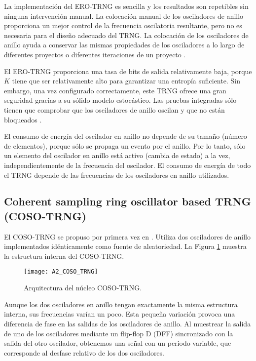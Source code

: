             La implementación del ERO-TRNG es sencilla y los resultados son repetibles sin ninguna intervención manual. La colocación manual de los osciladores de anillo proporciona un mejor control de la frecuencia oscilatoria resultante, pero no es necesaria para el diseño adecuado del TRNG. La colocación de los osciladores de anillo ayuda a conservar las mismas propiedades de los osciladores a lo largo de diferentes proyectos o diferentes iteraciones de un proyecto \cite{Choi2021}.

            El ERO-TRNG proporciona una tasa de bits de salida relativamente baja, porque $K$ tiene que ser relativamente alto para garantizar una entropía suficiente. Sin embargo, una vez configurado correctamente, este TRNG ofrece una gran seguridad gracias a su sólido modelo estocástico. Las pruebas integradas sólo tienen que comprobar que los osciladores de anillo oscilan y que no están bloqueados \cite{Bochard2010,Wold2008}.

            El consumo de energía del oscilador en anillo no depende de su tamaño (número de elementos), porque sólo se propaga un evento por el anillo. Por lo tanto, sólo un elemento del oscilador en anillo está activo (cambia de estado) a la vez, independientemente de la frecuencia del oscilador. El consumo de energía de todo el TRNG depende de las frecuencias de los osciladores en anillo utilizados.

		\subsection{Coherent sampling ring oscillator based TRNG (COSO-TRNG)}

                El COSO-TRNG se propuso por primera vez en \cite{Kohlbrenner2004}. Utiliza dos osciladores de anillo implementados idénticamente como fuente de aleatoriedad. La Figura \ref{fig:A2_COSO_TRNG} muestra la estructura interna del COSO-TRNG.
				\begin{figure}[hbtp]
					\caption{Arquitectura del núcleo COSO-TRNG.}
					\centering
					\texttt{[image: A2\_COSO\_TRNG]}
					\label{fig:A2_COSO_TRNG}
				\end{figure}

                Aunque los dos osciladores en anillo tengan exactamente la misma estructura interna, sus frecuencias varían un poco. Esta pequeña variación provoca una diferencia de fase en las salidas de los osciladores de anillo. Al muestrear la salida de uno de los osciladores mediante un flip-flop D (DFF) sincronizado con la salida del otro oscilador, obtenemos una señal con un periodo variable, que corresponde al desfase relativo de los dos osciladores.

